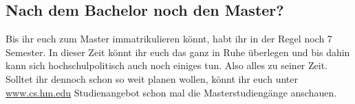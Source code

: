 \subsection{Nach dem Bachelor noch den Master?}
Bis ihr euch zum Master immatrikulieren könnt, habt ihr in der Regel 
noch 7 Semester. In dieser Zeit könnt ihr euch das ganz in Ruhe 
überlegen und bis dahin kann sich hochschulpolitisch auch noch einiges 
tun. Also alles zu seiner Zeit. Solltet ihr dennoch schon so weit planen 
wollen, könnt ihr euch unter \url{www.cs.hm.edu}  Studienangebot schon 
mal die Masterstudiengänge anschauen. 
